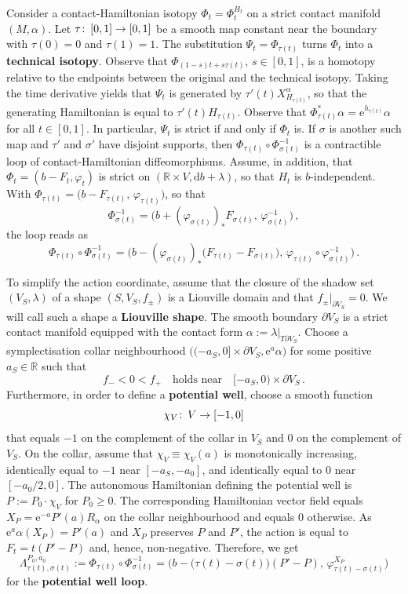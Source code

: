 \documentclass{amsart}
\theoremstyle{definition}
\def\co{\colon\thinspace}
\newcommand{\rmd}{\mathrm d}
\newcommand{\rme}{\mathrm e}
\newcommand{\R}{\mathbb R}
\newcommand{\ra}{\rightarrow}
\begin{document}
Consider a contact-Hamiltonian isotopy $\Phi_t=\Phi_t^{H_t}$
on a strict contact manifold $(M,\alpha)$.
Let $\tau\co[0,1]\ra[0,1]$ be a smooth map
constant near the boundary
with $\tau(0)=0$ and $\tau(1)=1$.
The substitution $\Psi_t=\Phi_{\tau(t)}$ turns $\Phi_t$ into a
{\bf technical isotopy}.
Observe that $\Phi_{(1-s)t+s\tau(t)}$, $s\in[0,1]$,
is a homotopy relative to the endpoints
between the original and the technical isotopy.
Taking the time derivative yields that
$\Psi_t$ is generated by $\tau'(t)X^{\alpha}_{H_{\tau(t)}}$,
so that the generating Hamiltonian is equal to $\tau'(t)H_{\tau(t)}$.
Observe that $\Phi_{\tau(t)}^*\alpha=\rme^{h_{\tau(t)}}\alpha$
for all $t\in[0,1]$.
In particular, $\Psi_t$ is strict if and only if $\Phi_t$ is.
If $\sigma$ is another such map and
$\tau'$ and $\sigma'$ have disjoint supports, then
$\Phi_{\tau(t)}\circ\Phi_{\sigma(t)}^{-1}$
is a contractible loop of contact-Hamiltonian diffeomorphisms.
Assume, in addition,  that
$\Phi_t=(b-F_t,\varphi_t)$
is strict on $(\R\times V,\rmd b+\lambda)$,
so that $H_t$ is $b$-independent.
With
$\Phi_{\tau(t)}=\big(b-F_{\tau(t)},\,\varphi_{\tau(t)}\big)$,
so that
\[
\Phi_{\sigma(t)}^{-1}=
\Big(
b+(\varphi_{\sigma(t)})_*F_{\sigma(t)},\,
\varphi_{\sigma(t)}^{-1}
\Big)
\,,
\]
the loop reads as
\[
\Phi_{\tau(t)}\circ\Phi_{\sigma(t)}^{-1}=
\Big(
  b-(\varphi_{\sigma(t)})_*
    \big(
      F_{\tau(t)}-F_{\sigma(t)}
    \big),\,
  \varphi_{\tau(t)}\circ\varphi_{\sigma(t)}^{-1}
\Big)
\,.
\]

To simplify the action coordinate,
assume that the closure of the shadow set $(V_S,\lambda)$
of a shape $(S,V_S,f_{\pm})$ is a Liouville domain
and that $f_{\pm}|_{\partial V_S}=0$.
We will call such a shape a {\bf Liouville shape}.
The smooth boundary $\partial V_S$ is a strict contact manifold
equipped with the contact form $\alpha:=\lambda|_{T\partial V_S}$.
Choose a symplectisation collar neighbourhood
$\big((-a_S,0]\times\partial V_S,\rme^a\alpha\big)$
for some positive $a_S\in\R$
such that
\[
f_-<0<f_+
\quad\text{holds near}\quad
[-a_S,0)\times\partial V_S
\,.
\]
Furthermore,
in order to define a {\bf potential well},
choose a smooth function
\[
\chi_V\co V\ra[-1,0]
\]
that equals $-1$ on the complement of the collar in $V_S$
and $0$ on the complement of $V_S$.
On the collar, assume that
$\chi_V\equiv\chi_V(a)$ is monotonically increasing,
identically equal to $-1$ near $[-a_S,-a_0]$,
and identically equal to $0$ near $[-a_0/2,0]$.
The autonomous Hamiltonian defining the potential well
is $P:=P_0\cdot\chi_V$ for $P_0\geq0$.
The corresponding Hamiltonian vector field equals
$X_P=\rme^{-a}P'(a)R_{\alpha}$ on the collar neighbourhood
and equals $0$ otherwise.
As $\rme^a\alpha(X_P)=P'(a)$ and
$X_P$ preserves $P$ and $P'$,
the action is equal to $F_t=t(P'-P)$
and, hence, non-negative.
Therefore, we get
\[
\Lambda_{\tau(t),\sigma(t)}^{P_0,a_0}:=
\Phi_{\tau(t)}\circ\Phi_{\sigma(t)}^{-1}=
\Big(
  b-\big(\tau(t)-\sigma(t)\big)(P'-P),\,
  \varphi_{\tau(t)-\sigma(t)}^{X_P}
\Big)
\]
for the {\bf potential well loop}.
\end{document}
